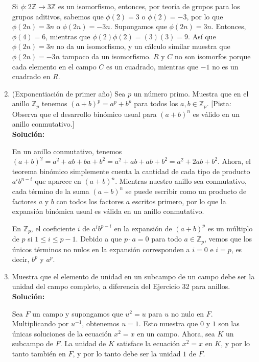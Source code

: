 \begin{enumerate}
	Si $\phi: 2\mathbb{Z} \to 3\mathbb{Z}$ es un isomorfismo, entonces, por teoría de grupos para los grupos aditivos, sabemos que $\phi(2) = 3$ o $\phi(2) = -3$, por lo que $\phi(2n) = 3n$ o $\phi(2n) = -3n$. Supongamos que $\phi(2n) = 3n$. Entonces, $\phi(4) = 6$, mientras que $\phi(2)\phi(2) = (3)(3) = 9$. Así que $\phi(2n) = 3n$ no da un isomorfismo, y un cálculo similar muestra que $\phi(2n) = -3n$ tampoco da un isomorfismo. $R$ y $C$ no son isomorfos porque cada elemento en el campo $C$ es un cuadrado, mientras que $-1$ no es un cuadrado en $R$.
	
	\item (Exponentiación de primer año) Sea $p$ un número primo. Muestra que en el anillo $\mathbb{Z}_p$ tenemos $(a + b)^p = a^p + b^p$ para todos los $a, b \in \mathbb{Z}_p$. [Pista: Observa que el desarrollo binómico usual para $(a + b)^n$ es válido en un anillo conmutativo.]
	\\ \textbf{Solución:}
	
	En un anillo conmutativo, tenemos $(a + b)^2 = a^2 + ab + ba + b^2 = a^2 + ab + ab + b^2 = a^2 + 2ab + b^2$. Ahora, el teorema binómico simplemente cuenta la cantidad de cada tipo de producto $a^ib^{n-i}$ que aparece en $(a + b)^n$. Mientras nuestro anillo sea conmutativo, cada término de la suma $(a + b)^n$ se puede escribir como un producto de factores $a$ y $b$ con todos los factores $a$ escritos primero, por lo que la expansión binómica usual es válida en un anillo conmutativo.
	
	En $\mathbb{Z}_p$, el coeficiente $i$ de $a^ib^{p-i}$ en la expansión de $(a + b)^p$ es un múltiplo de $p$ si $1 \leq i \leq p - 1$. Debido a que $p \cdot a = 0$ para todo $a \in \mathbb{Z}_p$, vemos que los únicos términos no nulos en la expansión corresponden a $i = 0$ e $i = p$, es decir, $b^p$ y $a^p$.
	
	\item Muestra que el elemento de unidad en un subcampo de un campo debe ser la unidad del campo completo, a diferencia del Ejercicio 32 para anillos.
	\\ \textbf{Solución:}
	
	Sea $F$ un campo y supongamos que $u^2 = u$ para $u$ no nulo en $F$. Multiplicando por $u^{-1}$, obtenemos $u = 1$. Esto muestra que $0$ y $1$ son las únicas soluciones de la ecuación $x^2 = x$ en un campo. Ahora, sea $K$ un subcampo de $F$. La unidad de $K$ satisface la ecuación $x^2 = x$ en $K$, y por lo tanto también en $F$, y por lo tanto debe ser la unidad $1$ de $F$.
	

\end{enumerate}
